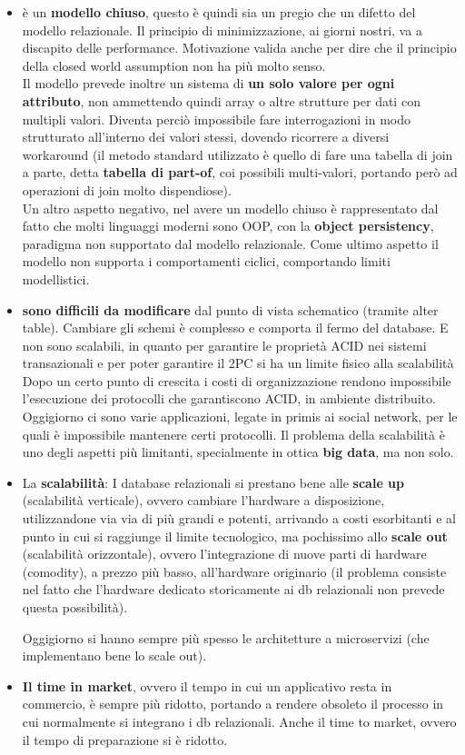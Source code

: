 \begin{itemize}
    \item è un \textbf{modello chiuso}, questo è quindi sia un pregio che un difetto del modello relazionale. Il principio di minimizzazione, ai giorni nostri, va a discapito delle performance. Motivazione valida anche per dire che il principio della closed world assumption non ha più molto senso. \\
    Il modello prevede inoltre un sistema di \textbf{un solo valore per ogni attributo}, non ammettendo quindi array o altre strutture per dati con multipli valori. Diventa perciò impossibile fare interrogazioni in modo strutturato all’interno dei valori stessi, dovendo ricorrere a diversi workaround (il metodo standard utilizzato è quello di fare una tabella di join a parte, detta \textbf{tabella di part-of}, coi possibili multi-valori, portando però ad operazioni di join molto dispendiose). \\
    Un altro aspetto negativo, nel avere un modello chiuso è rappresentato dal fatto che molti linguaggi moderni sono OOP, con la \textbf{object persistency}, paradigma non supportato dal modello relazionale. Come ultimo aspetto il modello non supporta i comportamenti ciclici, comportando limiti modellistici.
    \item \textbf{sono difficili da modificare} dal punto di vista schematico (tramite alter table).  Cambiare gli schemi è complesso e comporta il fermo del database. E non sono scalabili, in quanto per garantire le proprietà ACID nei sistemi transazionali e per poter garantire il 2PC si ha un limite fisico alla scalabilità
    Dopo un certo punto di crescita i costi di organizzazione rendono impossibile l’esecuzione dei protocolli che garantiscono ACID, in ambiente distribuito.  Oggigiorno ci sono varie applicazioni, legate in primis ai social network, per le quali è impossibile mantenere certi protocolli.  Il problema della scalabilità è uno degli aspetti più limitanti, specialmente in ottica \textbf{big data}, ma non solo. 
    
    \item La \textbf{scalabilità}: I database relazionali si prestano bene alle \textbf{scale up} (scalabilità verticale), ovvero cambiare l’hardware a disposizione, utilizzandone via via di più grandi e potenti, arrivando a costi esorbitanti e al punto in cui si raggiunge il limite tecnologico, ma pochissimo allo \textbf{scale out} (scalabilità orizzontale), ovvero l’integrazione di nuove parti di hardware (comodity), a prezzo più basso, all’hardware originario (il problema consiste nel fatto che l’hardware dedicato storicamente ai db relazionali non prevede questa possibilità).

    Oggigiorno si hanno sempre più spesso le architetture a microservizi (che implementano bene lo scale out).
    
    \item \textbf{Il time in market}, ovvero il tempo in cui un applicativo resta in commercio, è sempre più ridotto, portando a rendere obsoleto il processo in cui normalmente si integrano i db relazionali. Anche il time to market, ovvero il tempo di preparazione si è ridotto.
\end{itemize}


